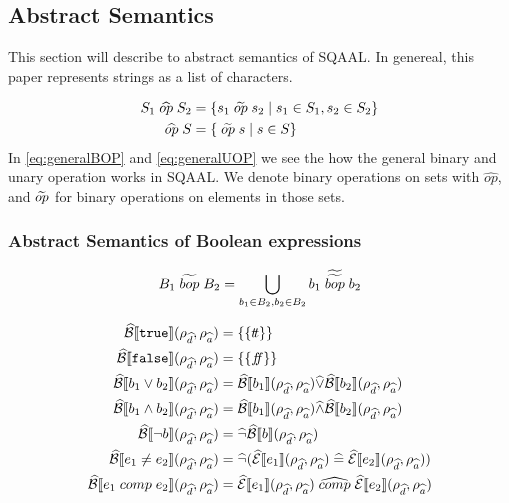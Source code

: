 \subsection{Abstract Semantics}
This section will describe to abstract semantics of SQAAL.
In genereal, this paper represents strings as a list of characters. 


\begin{align}\label{eq:generalBOP}
    S_1 \aop S_2 &= \{ s_1 \aaop s_2 \mid s_1 \in S_1, s_2 \in S_2 \} \\ \label{eq:generalUOP}
    \aop S &= \{\aaop s \mid s \in S \}
\end{align}
In \autoref{eq:generalBOP} and \autoref{eq:generalUOP} we see the how the general binary and unary operation works in SQAAL.
We denote binary operations on sets with $\widehat{op}$, and $\widetilde{op}$ for binary operations on elements in those sets.



\subsubsection{Abstract Semantics of Boolean expressions}

\begin{align}
    B_1 \;\widetilde{bop}\; B_2 = \bigcup_{b_1 \in B_2, b_2 \in B_2} b_1 \;\widetilde{\widetilde{bop}}\; b_2
\end{align}

\begin{align}
    \widehat{\mathcal{B}}\llbracket \texttt{true} \rrbracket(\rho_{\widehat{d}}, \rho_{\widehat{a}}) &= \{\{t\!t\}\} \\
    \widehat{\mathcal{B}}\llbracket \texttt{false} \rrbracket(\rho_{\widehat{d}}, \rho_{\widehat{a}}) &= \{\{f\!\!f\}\} \\
    \widehat{\mathcal{B}}\llbracket b_1 \lor b_2 \rrbracket(\rho_{\widehat{d}}, \rho_{\widehat{a}}) &= \widehat{\mathcal{B}}\llbracket b_1 \rrbracket(\rho_{\widehat{d}}, \rho_{\widehat{a}}) \widehat{\lor} \widehat{\mathcal{B}}\llbracket b_2 \rrbracket(\rho_{\widehat{d}}, \rho_{\widehat{a}}) \\
    \widehat{\mathcal{B}}\llbracket b_1 \land b_2 \rrbracket(\rho_{\widehat{d}}, \rho_{\widehat{a}}) &= \widehat{\mathcal{B}}\llbracket b_1 \rrbracket(\rho_{\widehat{d}}, \rho_{\widehat{a}}) \widehat{\land} \widehat{\mathcal{B}}\llbracket b_2 \rrbracket(\rho_{\widehat{d}}, \rho_{\widehat{a}}) \\
    \widehat{\mathcal{B}}\llbracket \neg b \rrbracket(\rho_{\widehat{d}}, \rho_{\widehat{a}}) &= \widehat{\neg} \widehat{\mathcal{B}}\llbracket b \rrbracket(\rho_{\widehat{d}}, \rho_{\widehat{a}}) \\
    \widehat{\mathcal{B}}\llbracket e_1 \neq e_2 \rrbracket(\rho_{\widehat{d}}, \rho_{\widehat{a}}) &= \widehat{\neg}(\widehat{\mathcal{E}}\llbracket e_1 \rrbracket(\rho_{\widehat{d}}, \rho_{\widehat{a}}) \;\widehat{=}\; \widehat{\mathcal{E}}\llbracket e_2 \rrbracket(\rho_{\widehat{d}}, \rho_{\widehat{a}})) \\
    \widehat{\mathcal{B}}\llbracket e_1 \;comp\; e_2 \rrbracket(\rho_{\widehat{d}}, \rho_{\widehat{a}}) &= \widehat{\mathcal{E}}\llbracket e_1 \rrbracket(\rho_{\widehat{d}}, \rho_{\widehat{a}}) \;\widehat{comp}\; \widehat{\mathcal{E}}\llbracket e_2 \rrbracket(\rho_{\widehat{d}}, \rho_{\widehat{a}}) \\
\end{align}

